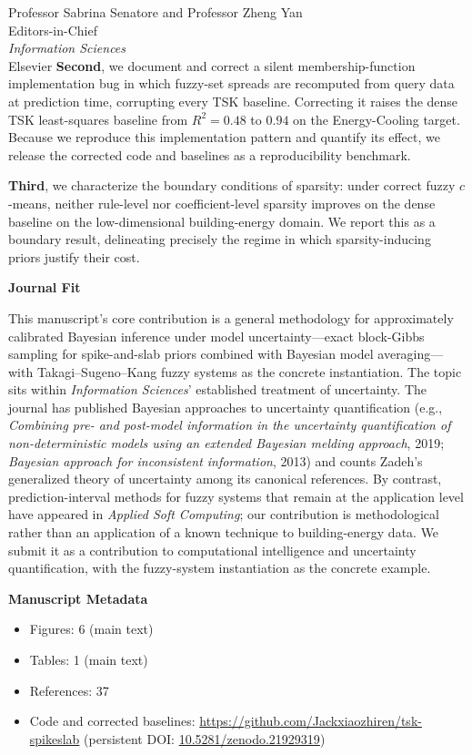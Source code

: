 \documentclass[11pt]{letter}
\begin{document}
\begin{letter}{Professor Sabrina Senatore and Professor Zheng Yan \\ Editors-in-Chief \\ \textit{Information Sciences} \\ Elsevier}
\textbf{Second}, we document and correct a silent membership-function implementation bug in which fuzzy-set spreads are recomputed from query data at prediction time, corrupting every TSK baseline. Correcting it raises the dense TSK least-squares baseline from $R^2=0.48$ to $0.94$ on the Energy-Cooling target. Because we reproduce this implementation pattern and quantify its effect, we release the corrected code and baselines as a reproducibility benchmark.

\textbf{Third}, we characterize the boundary conditions of sparsity: under correct fuzzy $c$-means, neither rule-level nor coefficient-level sparsity improves on the dense baseline on the low-dimensional building-energy domain. We report this as a boundary result, delineating precisely the regime in which sparsity-inducing priors justify their cost.

\noindent\textbf{Journal Fit}

This manuscript's core contribution is a general methodology for approximately calibrated Bayesian inference under model uncertainty---exact block-Gibbs sampling for spike-and-slab priors combined with Bayesian model averaging---with Takagi--Sugeno--Kang fuzzy systems as the concrete instantiation.
The topic sits within \textit{Information Sciences}' established treatment of uncertainty.
The journal has published Bayesian approaches to uncertainty quantification (e.g., \emph{Combining pre- and post-model information in the uncertainty quantification of non-deterministic models using an extended Bayesian melding approach}, 2019; \emph{Bayesian approach for inconsistent information}, 2013) and counts Zadeh's generalized theory of uncertainty among its canonical references. By contrast, prediction-interval methods for fuzzy systems that remain at the application level have appeared in \emph{Applied Soft Computing}; our contribution is methodological rather than an application of a known technique to building-energy data. We submit it as a contribution to computational intelligence and uncertainty quantification, with the fuzzy-system instantiation as the concrete example.

\noindent\textbf{Manuscript Metadata}

\begin{itemize}
\item Figures: 6 (main text)
\item Tables: 1 (main text)
\item References: 37
\item Code and corrected baselines: \url{https://github.com/Jackxiaozhiren/tsk-spikeslab} (persistent DOI: \href{https://doi.org/10.5281/zenodo.21929319}{10.5281/zenodo.21929319})
\end{itemize}


\end{letter}
\end{document}

